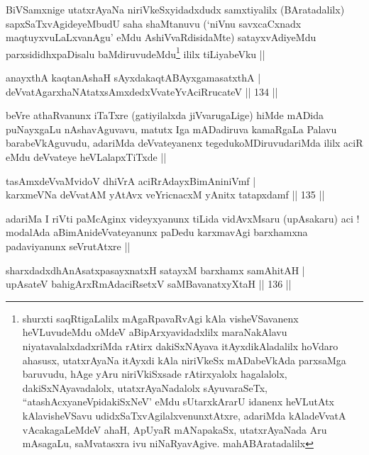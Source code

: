 \begin{artha}
BiVSamxnige utatxrAyaNa niriVkeSxyidadxdudx samxtiyalilx
(BAratadalilx) sapxSaTxvAgideyeMbudU saha shaMtanuvu (`niVnu
savxcaCxnadx maqtuyxvuLaLxvanAgu' eMdu AshiVvaRdisidaMte)
satayxvAdiyeMdu parxsididhxpaDisalu baMdiruvudeMdu\footnote{shurxti
  saqRtigaLalilx mAgaRpavaRvAgi kAla visheVSavanenx heVLuvudeMdu oMdeV
  aBipArxyavidadxlilx maraNakAlavu niyatavalalxdadxriMda rAtirx
  dakiSxNAyava itAyxdikAladalilx hoVdaro ahasusx, utatxrAyaNa itAyxdi
  kAla niriVkeSx mADabeVkAda parxsaMga baruvudu, hAge yAru
  niriVkiSxsade  rAtirxyalolx hagalalolx, dakiSxNAyavadalolx,
  utatxrAyaNadalolx sAyuvaraSeTx, ``atashAcxyaneV\s pidakiSxNeV' eMdu
  sUtarxkArarU idanenx heVLutAtx kAlavisheVSavu
  udidxSaTxvAgilalxvenunxtAtxre, adariMda kAladeVvatA vAcakagaLeMdeV
  ahaH, ApUyaR mANapakaSx, utatxrAyaNada Aru mAsagaLu, saMvatasxra ivu
  niNaRyavAgive. mahABAratadalilx} ililx tiLiyabeVku ||
\end{artha}

\begin{shl}
anayxthA kaqtanAshaH sAyxdakaqtABAyxgamasatxthA | \\
deVvatAgarxhaNAtatxsAmxdedxVvateYvAciRrucateV \hfill|| 134 || 
\end{shl}

\begin{artha}
beVre athaRvanunx iTaTxre (gatiyilalxda jiVvarugaLige) hiMde mADida
puNayxgaLu nAshavAguvavu, matutx Iga mADadiruva kamaRgaLa Palavu
barabeVkAguvudu, adariMda deVvateyanenx tegedukoMDiruvudariMda ililx
aciR eMdu deVvateye heVLalapxTiTxde ||
\end{artha}


\begin{shl}
tasAmxdeVvaMvidoV dhiVrA aciRrAdayxBimAniniVmf | \\
karxmeVNa deVvatAM yAtAvx veYricnacxM yAnitx tatapxdamf \hfill|| 135 || 
\end{shl}

\begin{artha}
adariMa I riVti paMcAginx videyxyanunx tiLida vidAvxMsaru (upAsakaru)
aci ! modalAda aBimAnideVvateyanunx paDedu karxmavAgi barxhamxna
padaviyanunx seVrutAtxre ||
\end{artha}


\begin{shl}
sharxdadxdhAnAsatxpasayxnatxH satayxM barxhamx samAhitAH | \\
upAsateV bahigArxRmAdaciRsetxV saMBavanatxyXtaH \hfill|| 136 || 
\end{shl}


